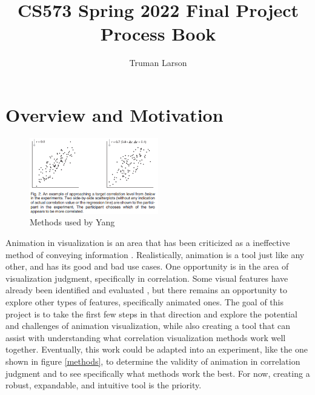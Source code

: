 \documentclass{proc}
\begin{document}
	
	\title{CS573 Spring 2022 Final Project Process Book}

	
	\author{Truman Larson}
	
	\maketitle
	
	\section{Overview and Motivation}
		\begin{figure} [t]
			\centering
			\includegraphics[width=0.5\textwidth]{methods}
			\caption{Methods used by Yang}
			\label{fig:methods}
		\end{figure}
		Animation in visualization is an area that has been criticized as a ineffective method of conveying information \cite{Robertson2008}. Realistically, animation is a tool just like any other, and has its good and bad use cases. One opportunity is in the area of visualization judgment, specifically in correlation. Some visual features have already been identified and evaluated \cite{Yang2019}, but there remains an opportunity to explore other types of features, specifically animated ones. The goal of this project is to take the first few steps in that direction and explore the potential and challenges of animation visualization, while also creating a tool that can assist with understanding what correlation visualization methods work well together. Eventually, this work could be adapted into an experiment, like the one shown in figure \ref{methods}, to determine the validity of animation in correlation judgment and to see specifically what methods work the best. For now, creating a robust, expandable, and intuitive tool is the priority. 
		
\end{document}
